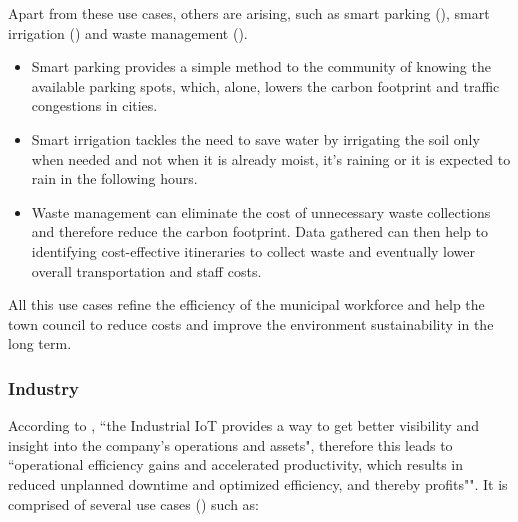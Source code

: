 Apart from these use cases, others are arising, such as smart parking (\cite{GOAP201841}), smart irrigation (\cite{7562735}) and waste management (\cite{7972276}).
\begin{itemize}
    \item Smart parking provides a simple method to the community of knowing the available parking spots, which, alone, lowers the carbon footprint and traffic congestions in cities.

    \item Smart irrigation tackles the need to save water by irrigating the soil only when needed and not when it is already moist, it's raining or it is expected to rain in the following hours.

    \item Waste management can eliminate the cost of unnecessary waste collections and therefore reduce the carbon footprint. Data gathered can then help to identifying cost-effective itineraries to collect waste and eventually lower overall transportation and staff costs.
\end{itemize}

All this use cases refine the efficiency of the municipal workforce and help the town council to reduce costs and improve the environment sustainability in the long term.

\subsubsection{Industry}
\label{subsubsec:stateofart:iot:areas:industry}

According to \cite{iiot}, ``the Industrial \gls{IoT} provides a way to get better visibility and insight into the company's operations and assets", therefore this leads to ``operational efficiency gains and accelerated productivity, which results in reduced unplanned downtime and optimized efficiency, and thereby profits"".
It is comprised of several use cases (\cite{iiot-cases}) such as:

